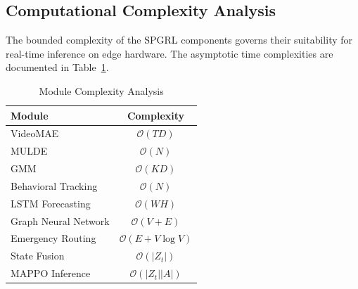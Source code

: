 \subsection{Computational Complexity Analysis}
The bounded complexity of the SPGRL components governs their suitability for real-time inference on edge hardware. The asymptotic time complexities are documented in Table~\ref{tab:complexity}.

\begin{table}[htbp]
\centering
\caption{Module Complexity Analysis}
\label{tab:complexity}
\begin{tabular}{|l|c|}
\hline
\textbf{Module} & \textbf{Complexity} \\
\hline
VideoMAE & $\mathcal{O}(TD)$ \\
MULDE & $\mathcal{O}(N)$ \\
GMM & $\mathcal{O}(KD)$ \\
Behavioral Tracking & $\mathcal{O}(N)$ \\
LSTM Forecasting & $\mathcal{O}(WH)$ \\
Graph Neural Network & $\mathcal{O}(V+E)$ \\
Emergency Routing & $\mathcal{O}(E+V\log V)$ \\
State Fusion & $\mathcal{O}(|Z_t|)$ \\
MAPPO Inference & $\mathcal{O}(|Z_t||A|)$ \\
\hline
\end{tabular}
\end{table}
